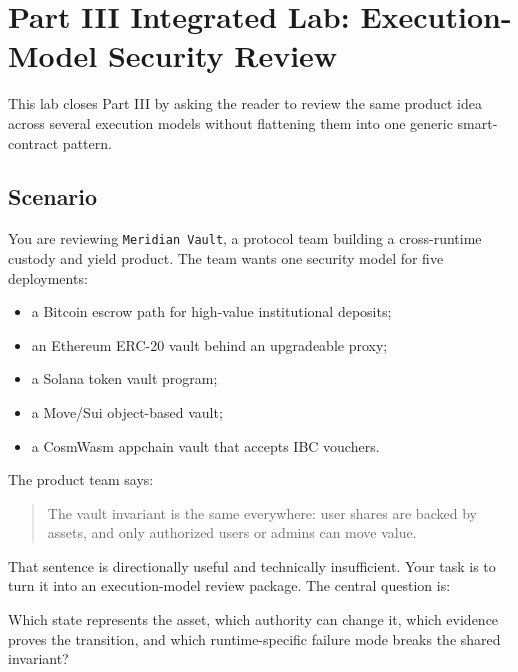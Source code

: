 \chapter*{Part III Integrated Lab: Execution-Model Security Review}
{}

\begin{labbox}
This lab closes Part III by asking the reader to review the same product idea across several execution models without flattening them into one generic smart-contract pattern.
\end{labbox}

\section*{Scenario}

You are reviewing \texttt{Meridian Vault}, a protocol team building a cross-runtime custody and yield product. The team wants one security model for five deployments:

\begin{itemize}
\item a Bitcoin escrow path for high-value institutional deposits;
\item an Ethereum ERC-20 vault behind an upgradeable proxy;
\item a Solana token vault program;
\item a Move/Sui object-based vault;
\item a CosmWasm appchain vault that accepts IBC vouchers.
\end{itemize}

The product team says:

\begin{quote}
The vault invariant is the same everywhere: user shares are backed by assets, and only authorized users or admins can move value.
\end{quote}

That sentence is directionally useful and technically insufficient. Your task is to turn it into an execution-model review package. The central question is:

\begin{codeblock}
Which state represents the asset, which authority can change it,
which evidence proves the transition, and which runtime-specific
failure mode breaks the shared invariant?
\end{codeblock}

